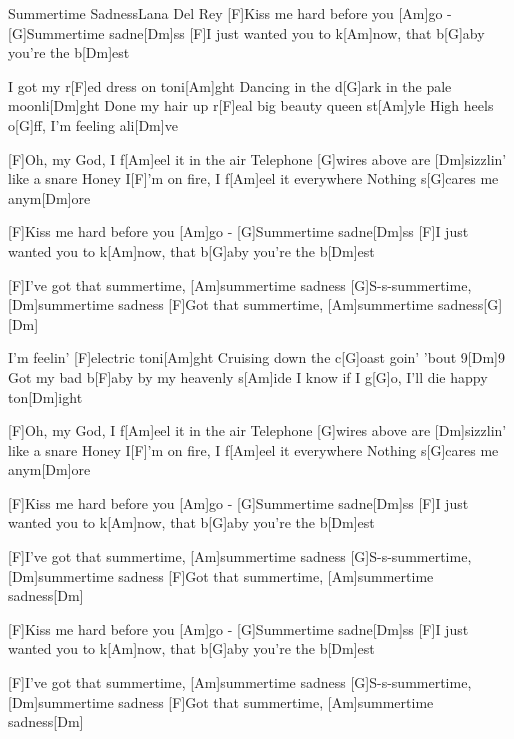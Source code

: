 \documentclass[../main.tex]{subfiles}
\begin{document}
\begin{song}[4]{Summertime Sadness}{Lana Del Rey}{}
[F]Kiss me hard before you [Am]go - [G]Summertime sadne[Dm]ss
[F]I just wanted you to k[Am]now, that b[G]aby you're the b[Dm]est

I got my r[F]ed dress on toni[Am]ght
Dancing in the d[G]ark in the pale moonli[Dm]ght
Done my hair up r[F]eal big beauty queen st[Am]yle
High heels o[G]ff, I'm feeling ali[Dm]ve

[F]Oh, my God, I f[Am]eel it in the air
Telephone [G]wires above are [Dm]sizzlin' like a snare
Honey I[F]'m on fire, I f[Am]eel it everywhere
Nothing s[G]cares me anym[Dm]ore

[F]Kiss me hard before you [Am]go - [G]Summertime sadne[Dm]ss
[F]I just wanted you to k[Am]now, that b[G]aby you're the b[Dm]est

[F]I've got that summertime, [Am]summertime sadness
[G]S-s-summertime, [Dm]summertime sadness
[F]Got that summertime, [Am]summertime sadness[G]{\hh}[Dm]{\hh}

I'm feelin' [F]electric toni[Am]ght
Cruising down the c[G]oast goin' 'bout 9[Dm]9
Got my bad b[F]aby by my heavenly s[Am]ide
I know if I g[G]o, I'll die happy ton[Dm]ight

[F]Oh, my God, I f[Am]eel it in the air
Telephone [G]wires above are [Dm]sizzlin' like a snare
Honey I[F]'m on fire, I f[Am]eel it everywhere
Nothing s[G]cares me anym[Dm]ore

[F]Kiss me hard before you [Am]go - [G]Summertime sadne[Dm]ss
[F]I just wanted you to k[Am]now, that b[G]aby you're the b[Dm]est

[F]I've got that summertime, [Am]summertime sadness
[G]S-s-summertime, [Dm]summertime sadness
[F]Got that summertime, [Am]summertime sadness{\hh}[Dm]{\hh}

[F]Kiss me hard before you [Am]go - [G]Summertime sadne[Dm]ss
[F]I just wanted you to k[Am]now, that b[G]aby you're the b[Dm]est

[F]I've got that summertime, [Am]summertime sadness
[G]S-s-summertime, [Dm]summertime sadness
[F]Got that summertime, [Am]summertime sadness{\hh}[Dm]{\hh}
\end{song}
\end{document}
